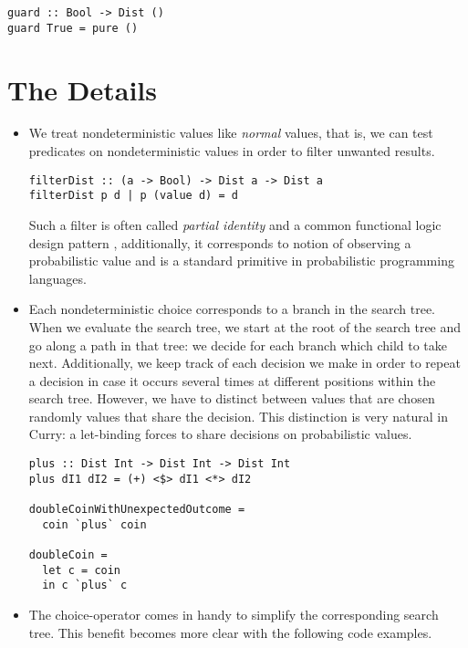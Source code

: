 \documentclass[
12pt, %
a4paper, %
oneside, %
]{llncs}
\begin{document}
\begin{verbatim}
guard :: Bool -> Dist ()
guard True = pure ()
\end{verbatim}

\section{The Details}

\begin{itemize}

\item We treat nondeterministic values like \emph{normal} values, that
  is, we can test predicates on nondeterministic values in order to
  filter unwanted results. %

\begin{verbatim}
filterDist :: (a -> Bool) -> Dist a -> Dist a
filterDist p d | p (value d) = d
\end{verbatim}

  Such a filter is often called \emph{partial identity} and a common
  functional logic design pattern \cite{funcLogPattern}, additionally,
  it corresponds to notion of observing a probabilistic value and is a
  standard primitive in probabilistic programming languages. %
 
\item Each nondeterministic choice corresponds to a branch in the
  search tree. %
  When we evaluate the search tree, we start at the root of the search
  tree and go along a path in that tree: we decide for each branch
  which child to take next. %
  Additionally, we keep track of each decision we make in order to
  repeat a decision in case it occurs several times at different
  positions within the search tree. %
  However, we have to distinct between values that are chosen randomly
  values that share the decision. %
  This distinction is very natural in Curry: a let-binding forces to
  share decisions on probabilistic values. %

\begin{verbatim}
plus :: Dist Int -> Dist Int -> Dist Int
plus dI1 dI2 = (+) <$> dI1 <*> dI2

doubleCoinWithUnexpectedOutcome =
  coin `plus` coin

doubleCoin =
  let c = coin
  in c `plus` c
\end{verbatim}

\item The choice-operator comes in handy to simplify the corresponding
  search tree. %
  This benefit becomes more clear with the following code examples. %


\end{itemize}
\end{document}
